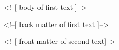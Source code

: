 \documentclass[11pt,twoside]{article}\makeatletter
\begin{document}
\begin{shaded}
\hspace*{6pt}\hspace*{6pt}\hspace*{6pt}\mbox{}\newline 
\begin{it}<!--[ body of first text  ]-->\end{it}\mbox{}\newline 
\hspace*{6pt}\hspace*{6pt}\hspace*{6pt}\mbox{}\newline 
\hspace*{6pt}\hspace*{6pt}\hspace*{6pt}\mbox{}\newline 
\begin{it}<!--[ back matter of first text ]-->\end{it}\mbox{}\newline 
\hspace*{6pt}\hspace*{6pt}\hspace*{6pt}\mbox{}\newline 
\hspace*{6pt}\hspace*{6pt}\mbox{}\newline 
\hspace*{6pt}\hspace*{6pt}\mbox{}\newline 
\hspace*{6pt}\hspace*{6pt}\hspace*{6pt}\mbox{}\newline 
\begin{it}<!--[ front matter of second text]-->\end{it}\mbox{}\newline 
\hspace*{6pt}\hspace*{6pt}\hspace*{6pt}\mbox{}\newline 

\end{shaded}
\end{document}

